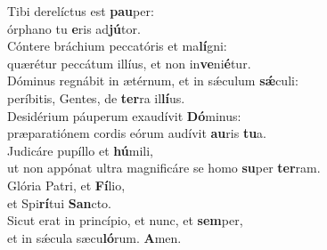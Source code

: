 \evenverse Tibi derelíctus est \textbf{pau}per:~\*\\
\evenverse órphano tu \textbf{e}ris ad\textbf{jú}tor.\\
\oddverse Cóntere bráchium peccatóris et ma\textbf{lí}gni:~\*\\
\oddverse quærétur peccátum illíus, et non in\textbf{ve}ni\textbf{é}tur.\\
\evenverse Dóminus regnábit in ætérnum, et in sǽculum \textbf{sǽ}culi:~\*\\
\evenverse períbitis, Gentes, de \textbf{ter}ra il\textbf{lí}us.\\
\oddverse Desidérium páuperum exaudívit \textbf{Dó}minus:~\*\\
\oddverse præparatiónem cordis eórum audívit \textbf{au}ris \textbf{tu}a.\\
\evenverse Judicáre pupíllo et \textbf{hú}mili,~\*\\
\evenverse ut non appónat ultra magnificáre se homo \textbf{su}per \textbf{ter}ram.\\
\oddverse Glória Patri, et \textbf{Fí}lio,~\*\\
\oddverse et Spi\textbf{rí}tui \textbf{San}cto.\\
\evenverse Sicut erat in princípio, et nunc, et \textbf{sem}per,~\*\\
\evenverse et in sǽcula sæcu\textbf{ló}rum. \textbf{A}men.\\
